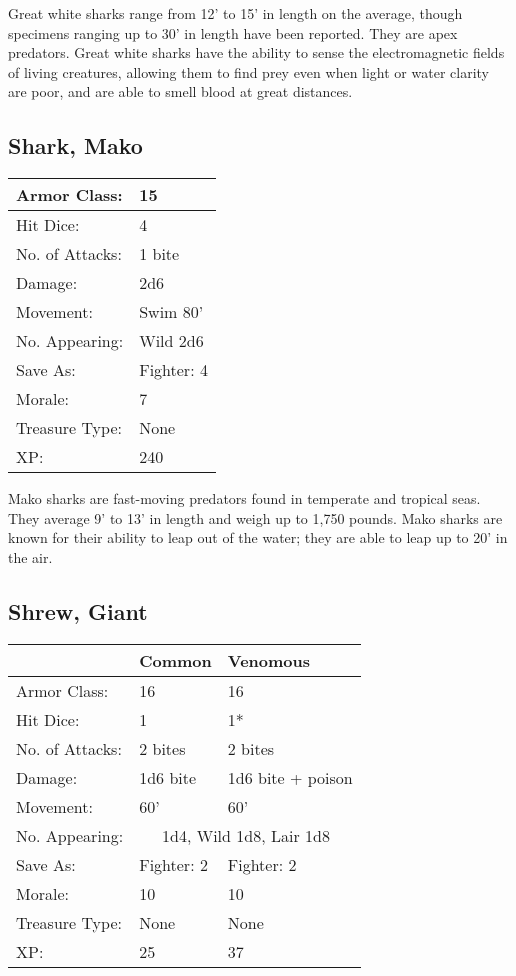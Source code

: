 \documentclass[a4paper,twoside,openany,10pt]{book}
\begin{document}
\begin{multicols}{2}
Great white sharks range from 12' to 15' in length on the average, though specimens ranging up to 30' in length have been reported. They are apex predators. Great white sharks have the ability to sense the electromagnetic fields of living creatures, allowing them to find prey even when light or water clarity are poor, and are able to smell blood at great distances.

\subsection*{Shark, Mako}\label{shark-mako}

\begin{tabularx}{0.50\textwidth}{@{}lX@{}}
Armor Class: & 15 \\\hline
Hit Dice: & 4 \\\hline
No. of Attacks: & 1 bite \\\hline
Damage: & 2d6 \\\hline
Movement: & Swim 80' \\\hline
No. Appearing: & Wild 2d6 \\\hline
Save As: & Fighter: 4 \\\hline
Morale: & 7 \\\hline
Treasure Type: & None \\\hline
XP: & 240 \\\hline
\end{tabularx}\medskip

Mako sharks are fast-moving predators found in temperate and tropical seas. They average 9' to 13' in length and weigh up to 1,750 pounds. Mako sharks are known for their ability to leap out of the water; they are able to leap up to 20' in the air.

\subsection*{Shrew, Giant}\label{shrew-giant}

\begin{tabularx}{0.50\textwidth}{@{}lXX@{}}
& Common & Venomous \\\hline
Armor Class: & 16 & 16 \\\hline
Hit Dice: & 1 & 1* \\\hline
No. of Attacks: & 2 bites & 2 bites \\\hline
Damage: & 1d6 bite & 1d6 bite + poison \\\hline
Movement: & 60' & 60' \\\hline
No. Appearing: &  \multicolumn{2}{c}{1d4, Wild 1d8, Lair 1d8}\\\hline
Save As: & Fighter: 2 & Fighter: 2 \\\hline
Morale: & 10 & 10 \\\hline
Treasure Type: & None & None \\\hline
XP: & 25 & 37 \\\hline
\end{tabularx}\medskip


\end{multicols}
\end{document}
